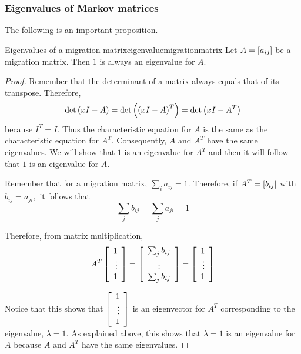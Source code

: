 \subsubsection{Eigenvalues of Markov matrices}

The following is an important proposition.

\begin{proposition}{Eigenvalues of a migration matrix}{eigenvaluemigrationmatrix}
Let $A=\left[ a_{ij}\right] $ be a migration matrix. Then $1$ is always an
eigenvalue for $A.$
\end{proposition}

\begin{proof} Remember that the determinant of a matrix always equals that of its transpose. 
Therefore,
\begin{equation*}
\det \left( x I - A\right) =\det \left( \left( x I - A\right)
^{T}\right) =\det \left( x I - A^T\right)
\end{equation*}
because $I^{T}=I.$ Thus the characteristic equation for $A$ is the same as
the characteristic equation for $A^{T}$. Consequently, $A$ and $A^{T}$ have the same
eigenvalues. We will show that $1$ is an eigenvalue for $A^{T}$ and then it
will follow that $1$ is an eigenvalue for $A$.

Remember that for a migration matrix, $\sum_{i}a_{ij}=1.$ Therefore, if 
$A^{T}=\left[ b_{ij}\right] $ with $b_{ij}=a_{ji},$ it follows that
\begin{equation*}
\sum_{j}b_{ij}=\sum_{j}a_{ji}=1
\end{equation*}

Therefore, from matrix multiplication,
\begin{equation*}
A^{T}\left[
\begin{array}{r}
1 \\
\vdots \\
1
\end{array}
\right] =\left[
\begin{array}{c}
\sum_{j}b_{ij} \\
\vdots \\
\sum_{j}b_{ij}
\end{array}
\right] =\left[
\begin{array}{r}
1 \\
\vdots \\
1
\end{array}
\right]
\end{equation*}

Notice that this shows that $\left[
\begin{array}{r}
1 \\
\vdots \\
1
\end{array}
\right] $ is an eigenvector for $A^{T}$ corresponding to the eigenvalue, $\lambda =1.$
 As explained above, this shows that $\lambda =1$ is an
eigenvalue for $A$ because $A$ and $A^{T}$ have the same eigenvalues. 
\end{proof}